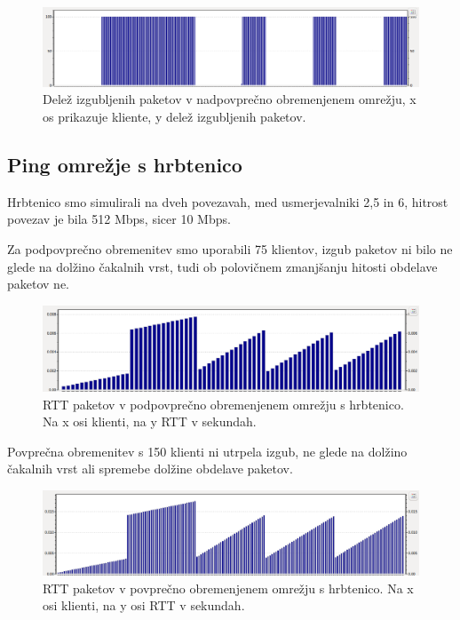 \documentclass[11pt, a4paper, slovene]{book}
\begin{document}
\begin{figure}[h]
	\centering
	\includegraphics[width=\textwidth]{hPL1.png}
	\caption{Delež izgubljenih paketov v nadpovprečno obremenjenem omrežju, x os prikazuje kliente, y delež izgubljenih paketov.}
	\label{hPL1}	
\end{figure}
\pagebreak

\subsection{Ping omrežje s hrbtenico} 

Hrbtenico smo simulirali na dveh povezavah, med usmerjevalniki 2,5 in 6, hitrost povezav je bila 512 Mbps, sicer 10 Mbps. 

Za podpovprečno obremenitev smo uporabili 75 klientov, izgub paketov ni bilo ne glede na dolžino čakalnih vrst, tudi ob polovičnem zmanjšanju hitosti obdelave paketov ne. 

\begin{figure}[h]
	\centering
	\includegraphics[width=\textwidth]{lRtt2.png}
	\caption{RTT paketov v podpovprečno obremenjenem omrežju s hrbtenico. Na x osi klienti, na y RTT v sekundah.}
	\label{RTT4}	
\end{figure}

Povprečna obremenitev s 150 klienti ni utrpela izgub, ne glede na dolžino čakalnih vrst ali spremebe dolžine obdelave paketov.
\begin{figure}[h]
	\centering
	\includegraphics[width=\textwidth]{aRtt2.png}
	\caption{RTT paketov v povprečno obremenjenem omrežju s hrbtenico. Na x osi klienti, na y osi RTT v sekundah.}
	\label{RTT5}	
\end{figure}
\end{document}
